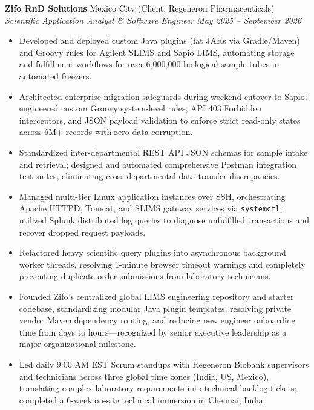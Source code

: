 \documentclass[10pt, letterpaper]{article}
\newcommand{\jobentry}[4]{%
    \textbf{#1} \hfill #3 \\
    \textit{#2} \hfill \textit{#4}
    \vspace{2pt}
}
\begin{document}
\jobentry{Zifo RnD Solutions}{Scientific Application Analyst \& Software Engineer}{Mexico City (Client: Regeneron Pharmaceuticals)}{May 2025 -- September 2026}
\begin{itemize}
    \item Developed and deployed custom Java plugins (fat JARs via Gradle/Maven) and Groovy rules for Agilent SLIMS and Sapio LIMS, automating storage and fulfillment workflows for over 6,000,000 biological sample tubes in automated freezers.
    \item Architected enterprise migration safeguards during weekend cutover to Sapio: engineered custom Groovy system-level rules, API 403 Forbidden interceptors, and JSON payload validation to enforce strict read-only states across 6M+ records with zero data corruption.
    \item Standardized inter-departmental REST API JSON schemas for sample intake and retrieval; designed and automated comprehensive Postman integration test suites, eliminating cross-departmental data transfer discrepancies.
    \item Managed multi-tier Linux application instances over SSH, orchestrating Apache HTTPD, Tomcat, and SLIMS gateway services via \texttt{systemctl}; utilized Splunk distributed log queries to diagnose unfulfilled transactions and recover dropped request payloads.
    \item Refactored heavy scientific query plugins into asynchronous background worker threads, resolving 1-minute browser timeout warnings and completely preventing duplicate order submissions from laboratory technicians.
    \item Founded Zifo's centralized global LIMS engineering repository and starter codebase, standardizing modular Java plugin templates, resolving private vendor Maven dependency routing, and reducing new engineer onboarding time from days to hours---recognized by senior executive leadership as a major organizational milestone.
    \item Led daily 9:00 AM EST Scrum standups with Regeneron Biobank supervisors and technicians across three global time zones (India, US, Mexico), translating complex laboratory requirements into technical backlog tickets; completed a 6-week on-site technical immersion in Chennai, India.
\end{itemize}

\vspace{2pt}
\end{document}
